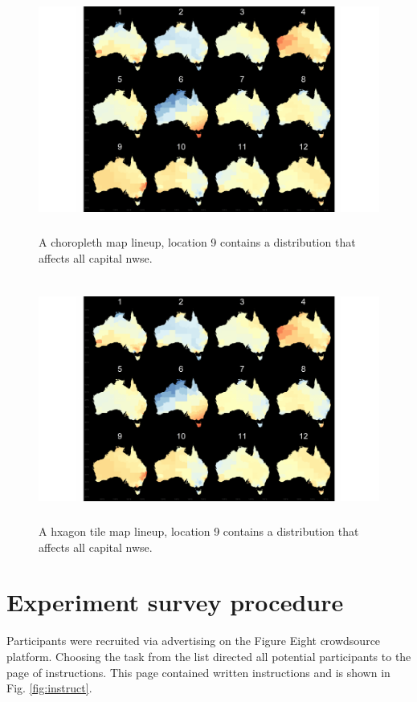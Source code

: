 \documentclass{monashthesis}
\begin{document}
\begin{figure}[H]
\centering
\includegraphics[height=8cm]{lineups/nwse-geo6-1.pdf}
\caption{\label{fig:nwse-geo6}A choropleth map lineup, location 9 contains a distribution that affects all capital nwse.}
\end{figure}

\begin{figure}[H]
\centering
\includegraphics[height=8cm]{lineups/nwse-hex6-1.pdf}
\caption{\label{fig:nwse-hex6}A hxagon tile map lineup, location 9 contains a distribution that affects all capital nwse.}
\end{figure}

\hypertarget{experiment-survey-procedure}{%
\section{Experiment survey procedure}\label{experiment-survey-procedure}}

Participants were recruited via advertising on the Figure Eight crowdsource platform.
Choosing the task from the list directed all potential participants to the page of instructions.
This page contained written instructions and is shown in Fig. \ref{fig:instruct}.
\end{document}
